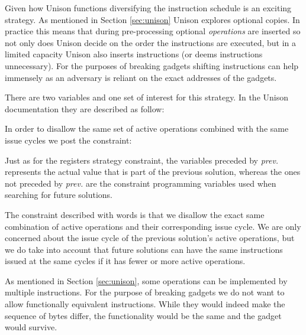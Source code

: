 Given how Unison functions diversifying the instruction schedule is an exciting strategy.
As mentioned in Section \ref{sec:unison} Unison explores optional copies. In practice this
means that during pre-processing optional \textit{operations} are inserted so not only
does Unison decide on the order the instructions are executed, but in a limited capacity
Unison also inserts instructions (or deems instructions unnecessary). For the purposes
of breaking gadgets shifting instructions can help immensely as an adversary is reliant
on the exact addresses of the gadgets.

There are two variables and one set of interest for this strategy. In the Unison
documentation they are described as follow:

\vspace{0.2cm}

\noindent{}

\vspace{0.2cm}

In order to disallow the same set of active operations combined with the same issue cycles
we post the constraint: 

\vspace{0.2cm}
\noindent{}
\vspace{0.2cm}

Just as for the registers strategy constraint, the variables preceded by \textit{prev.}
represents the actual value that is part of the previous solution, whereas the ones not
preceded by \textit{prev.} are the constraint programming variables used when searching for
future solutions.

The constraint described with words is that we disallow the exact same combination of
active operations and their corresponding issue cycle. We are only concerned about the
issue cycle of the previous solution's active operations, but we do take into account that
future solutions can have the same instructions issued at the same cycles if it has fewer
or more active operations.

As mentioned in Section \ref{sec:unison}, some operations can be implemented by multiple
instructions. For the purpose of breaking gadgets we do not want to allow functionally
equivalent instructions. While they would indeed make the sequence of bytes differ, the
functionality would be the same and the gadget would survive.
